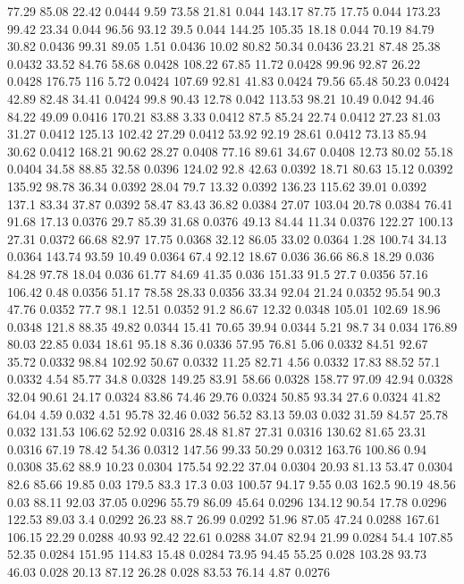 77.29	85.08	22.42	0.0444
9.59	73.58	21.81	0.044
143.17	87.75	17.75	0.044
173.23	99.42	23.34	0.044
96.56	93.12	39.5	0.044
144.25	105.35	18.18	0.044
70.19	84.79	30.82	0.0436
99.31	89.05	1.51	0.0436
10.02	80.82	50.34	0.0436
23.21	87.48	25.38	0.0432
33.52	84.76	58.68	0.0428
108.22	67.85	11.72	0.0428
99.96	92.87	26.22	0.0428
176.75	116	5.72	0.0424
107.69	92.81	41.83	0.0424
79.56	65.48	50.23	0.0424
42.89	82.48	34.41	0.0424
99.8	90.43	12.78	0.042
113.53	98.21	10.49	0.042
94.46	84.22	49.09	0.0416
170.21	83.88	3.33	0.0412
87.5	85.24	22.74	0.0412
27.23	81.03	31.27	0.0412
125.13	102.42	27.29	0.0412
53.92	92.19	28.61	0.0412
73.13	85.94	30.62	0.0412
168.21	90.62	28.27	0.0408
77.16	89.61	34.67	0.0408
12.73	80.02	55.18	0.0404
34.58	88.85	32.58	0.0396
124.02	92.8	42.63	0.0392
18.71	80.63	15.12	0.0392
135.92	98.78	36.34	0.0392
28.04	79.7	13.32	0.0392
136.23	115.62	39.01	0.0392
137.1	83.34	37.87	0.0392
58.47	83.43	36.82	0.0384
27.07	103.04	20.78	0.0384
76.41	91.68	17.13	0.0376
29.7	85.39	31.68	0.0376
49.13	84.44	11.34	0.0376
122.27	100.13	27.31	0.0372
66.68	82.97	17.75	0.0368
32.12	86.05	33.02	0.0364
1.28	100.74	34.13	0.0364
143.74	93.59	10.49	0.0364
67.4	92.12	18.67	0.036
36.66	86.8	18.29	0.036
84.28	97.78	18.04	0.036
61.77	84.69	41.35	0.036
151.33	91.5	27.7	0.0356
57.16	106.42	0.48	0.0356
51.17	78.58	28.33	0.0356
33.34	92.04	21.24	0.0352
95.54	90.3	47.76	0.0352
77.7	98.1	12.51	0.0352
91.2	86.67	12.32	0.0348
105.01	102.69	18.96	0.0348
121.8	88.35	49.82	0.0344
15.41	70.65	39.94	0.0344
5.21	98.7	34	0.034
176.89	80.03	22.85	0.034
18.61	95.18	8.36	0.0336
57.95	76.81	5.06	0.0332
84.51	92.67	35.72	0.0332
98.84	102.92	50.67	0.0332
11.25	82.71	4.56	0.0332
17.83	88.52	57.1	0.0332
4.54	85.77	34.8	0.0328
149.25	83.91	58.66	0.0328
158.77	97.09	42.94	0.0328
32.04	90.61	24.17	0.0324
83.86	74.46	29.76	0.0324
50.85	93.34	27.6	0.0324
41.82	64.04	4.59	0.032
4.51	95.78	32.46	0.032
56.52	83.13	59.03	0.032
31.59	84.57	25.78	0.032
131.53	106.62	52.92	0.0316
28.48	81.87	27.31	0.0316
130.62	81.65	23.31	0.0316
67.19	78.42	54.36	0.0312
147.56	99.33	50.29	0.0312
163.76	100.86	0.94	0.0308
35.62	88.9	10.23	0.0304
175.54	92.22	37.04	0.0304
20.93	81.13	53.47	0.0304
82.6	85.66	19.85	0.03
179.5	83.3	17.3	0.03
100.57	94.17	9.55	0.03
162.5	90.19	48.56	0.03
88.11	92.03	37.05	0.0296
55.79	86.09	45.64	0.0296
134.12	90.54	17.78	0.0296
122.53	89.03	3.4	0.0292
26.23	88.7	26.99	0.0292
51.96	87.05	47.24	0.0288
167.61	106.15	22.29	0.0288
40.93	92.42	22.61	0.0288
34.07	82.94	21.99	0.0284
54.4	107.85	52.35	0.0284
151.95	114.83	15.48	0.0284
73.95	94.45	55.25	0.028
103.28	93.73	46.03	0.028
20.13	87.12	26.28	0.028
83.53	76.14	4.87	0.0276
